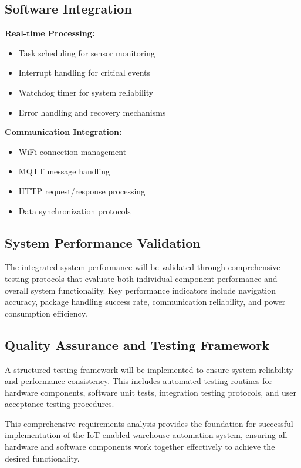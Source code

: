\subsection{Software Integration}
\textbf{Real-time Processing:}
\begin{itemize}
\item Task scheduling for sensor monitoring
\item Interrupt handling for critical events
\item Watchdog timer for system reliability
\item Error handling and recovery mechanisms
\end{itemize}

\textbf{Communication Integration:}
\begin{itemize}
\item WiFi connection management
\item MQTT message handling
\item HTTP request/response processing
\item Data synchronization protocols
\end{itemize}

\subsection{System Performance Validation}
The integrated system performance will be validated through comprehensive testing protocols that evaluate both individual component performance and overall system functionality. Key performance indicators include navigation accuracy, package handling success rate, communication reliability, and power consumption efficiency.

\subsection{Quality Assurance and Testing Framework}
A structured testing framework will be implemented to ensure system reliability and performance consistency. This includes automated testing routines for hardware components, software unit tests, integration testing protocols, and user acceptance testing procedures.

This comprehensive requirements analysis provides the foundation for successful implementation of the IoT-enabled warehouse automation system, ensuring all hardware and software components work together effectively to achieve the desired functionality.